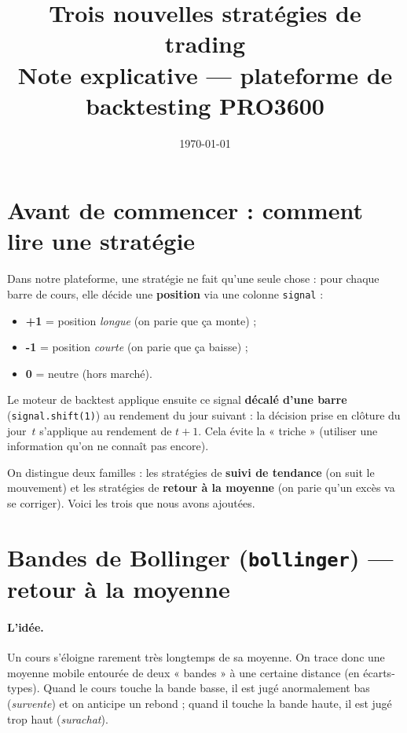 \documentclass[11pt,a4paper]{article}
\title{\vspace{-1.5cm}\textbf{Trois nouvelles stratégies de trading}\\[2pt]
\large Note explicative --- plateforme de backtesting PRO3600}
\author{}
\date{\today}
\newcommand{\code}[1]{\texttt{#1}}
\begin{document}
\maketitle
\vspace{-1cm}

\section*{Avant de commencer : comment lire une stratégie}
Dans notre plateforme, une stratégie ne fait qu'une seule chose : pour chaque
barre de cours, elle décide une \textbf{position} via une colonne \code{signal} :
\begin{itemize}[leftmargin=1.5em,nosep]
  \item \textbf{+1} = position \emph{longue} (on parie que ça monte) ;
  \item \textbf{-1} = position \emph{courte} (on parie que ça baisse) ;
  \item \textbf{0} = neutre (hors marché).
\end{itemize}
Le moteur de backtest applique ensuite ce signal \textbf{décalé d'une barre}
(\code{signal.shift(1)}) au rendement du jour suivant : la décision prise en
clôture du jour~$t$ s'applique au rendement de $t{+}1$. Cela évite la
« triche » (utiliser une information qu'on ne connaît pas encore).

\medskip
On distingue deux familles : les stratégies de \textbf{suivi de tendance} (on
suit le mouvement) et les stratégies de \textbf{retour à la moyenne} (on parie
qu'un excès va se corriger). Voici les trois que nous avons ajoutées.

\section{Bandes de Bollinger \textnormal{(\code{bollinger})} --- retour à la moyenne}

\paragraph{L'idée.} Un cours s'éloigne rarement très longtemps de sa moyenne. On
trace donc une moyenne mobile entourée de deux « bandes » à une certaine distance
(en écarts-types). Quand le cours touche la bande basse, il est jugé
anormalement bas (\emph{survente}) et on anticipe un rebond ; quand il touche la
bande haute, il est jugé trop haut (\emph{surachat}).
\end{document}
